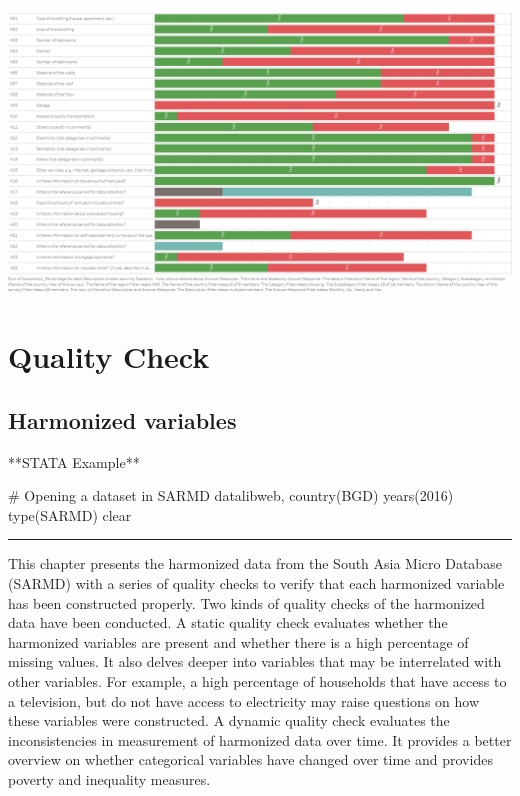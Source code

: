 \documentclass[13 pt,]{book}
\newenvironment{Shaded}{\begin{snugshade}}{\end{snugshade}}
\newcommand{\FunctionTok}[1]{\textcolor[rgb]{0.00,0.00,0.00}{{#1}}}
\newcommand{\NormalTok}[1]{{#1}}
\begin{document}
\href{https://tab.worldbank.org/\#/site/WBG/views/SAR_MNA_Metadata/Housing}{\includegraphics{figures/Housing.png}}

\part{Quality Check}\label{part-quality-check}

\chapter{Harmonized variables}\label{qcheck}

\begin{Shaded}
\begin{Highlighting}[]
\NormalTok{**STATA Example**}

\FunctionTok{# Opening a dataset in SARMD}
\NormalTok{datalibweb, country(BGD) years(2016) type(SARMD) clear}
\end{Highlighting}
\end{Shaded}

\begin{center}\rule{0.5\linewidth}{\linethickness}\end{center}

This chapter presents the harmonized data from the South Asia Micro
Database (SARMD) with a series of quality checks to verify that each
harmonized variable has been constructed properly. Two kinds of quality
checks of the harmonized data have been conducted. A static quality
check evaluates whether the harmonized variables are present and whether
there is a high percentage of missing values. It also delves deeper into
variables that may be interrelated with other variables. For example, a
high percentage of households that have access to a television, but do
not have access to electricity may raise questions on how these
variables were constructed. A dynamic quality check evaluates the
inconsistencies in measurement of harmonized data over time. It provides
a better overview on whether categorical variables have changed over
time and provides poverty and inequality measures.
\end{document}
